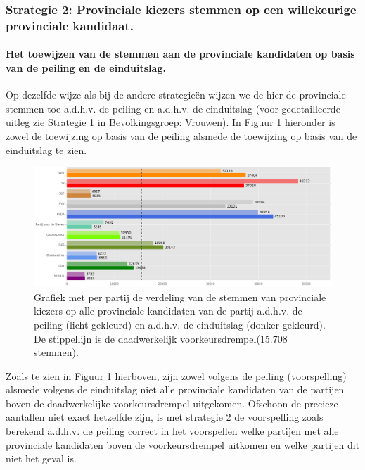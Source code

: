\subsubsection{Strategie 2: Provinciale kiezers stemmen op een willekeurige provinciale kandidaat.}

\paragraph{Het toewijzen van de stemmen aan de provinciale kandidaten op basis van de peiling en de einduitslag.}
Op dezelfde wijze als bij de andere strategie\"{e}n wijzen we de hier de provinciale stemmen toe a.d.h.v. de peiling en a.d.h.v. de einduitslag (voor gedetailleerde uitleg zie \hyperref[S1V]{Strategie 1} in \hyperref[vrouwen]{Bevolkingsgroep: Vrouwen}). In Figuur \ref{fig:stemmenS2P} hieronder is zowel de toewijzing op basis van de peiling alsmede de toewijzing op basis van de einduitslag te zien.


\begin{figure}[H]

	\includegraphics[width=\linewidth]	{stemmen_op_provincialen_willekeurig_samen.png}

			\caption{Grafiek met per partij de verdeling van de stemmen van provinciale kiezers op alle provinciale kandidaten van de partij a.d.h.v. de peiling (licht gekleurd) en a.d.h.v. de einduitslag (donker gekleurd). De stippellijn is de daadwerkelijk voorkeursdrempel(15.708 stemmen).}

\label{fig:stemmenS2P}
\end{figure}

Zoals te zien in Figuur \ref{fig:stemmenS2P} hierboven, zijn zowel volgens de peiling (voorspelling) alsmede volgens de einduitslag niet alle provinciale kandidaten van de partijen boven de daadwerkelijke voorkeursdrempel uitgekomen. Ofschoon de precieze aantallen niet exact hetzelfde zijn, is met strategie 2 de voorspelling zoals berekend a.d.h.v. de peiling correct in het voorspellen welke partijen met alle provinciale kandidaten boven de voorkeursdrempel uitkomen en welke partijen dit niet het geval is. 


